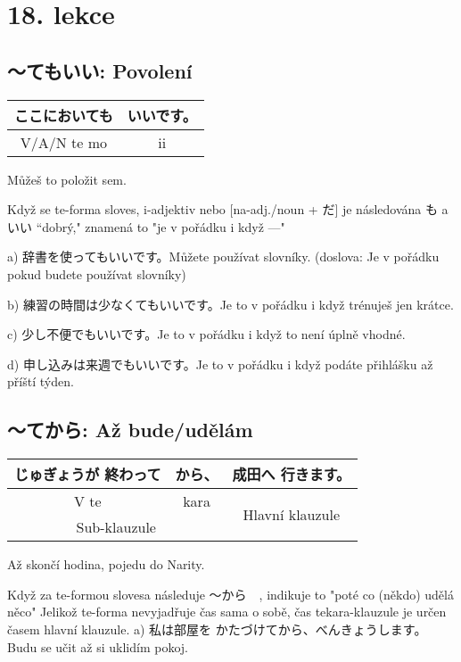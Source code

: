 \section{18. lekce}
\label{sec:lekce_18}

\subsection{〜てもいい: Povolení}
\begin{center}
\begin{tabular}{|c|c|}
\hline
ここにおいても &いいです。\\
\hline
V/A/N te mo&ii\\
\hline
\end{tabular}
\end{center}
Můžeš to položit sem.

Když se te-forma sloves, i-adjektiv nebo  [na-adj./noun + だ] je následována も a いい “dobrý," znamená to "je v pořádku i když ---"

a) 辞書を使ってもいいです。Můžete používat slovníky. (doslova: Je v pořádku pokud budete používat slovníky)

b) 練習の時間は少なくてもいいです。Je to v pořádku i když trénuješ jen krátce.

c) 少し不便でもいいです。Je to v pořádku i když to není úplně vhodné.

d) 申し込みは来週でもいいです。Je to v pořádku i když podáte přihlášku až příští týden.

\subsection{〜てから: Až bude/udělám}
\begin{center}
\begin{tabular}{|c|c|c|}
\hline
じゅぎょうが 終わって & から、&成田へ 行きます。\\
\hline
V te &kara&\multirow{2}{*}{Hlavní klauzule}\\
\multicolumn{2}{c}{Sub-klauzule}&\\
\hline
\end{tabular}
\end{center}
Až skončí hodina, pojedu do Narity.

Když za te-formou slovesa následuje 〜から　, indikuje to  "poté co (někdo) udělá něco"
Jelikož te-forma nevyjadřuje čas sama o sobě, čas tekara-klauzule je určen časem hlavní klauzule.
a) 私は部屋を かたづけてから、べんきょうします。 Budu se učit až si uklidím pokoj.

